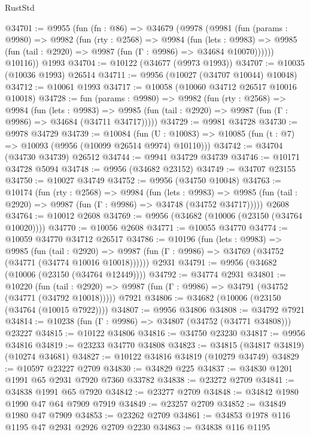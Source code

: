 \begin{lexlean}{RustStd}
\begin{coremodule}
@34701 := @9955
    (fun (fn : @86) =>
    @34679
      (@9978
        (@9981
          (fun (params : @9980) =>
          @9982
            (fun (rty : @2568) =>
            @9984
              (fun (lets : @9983) =>
              @9985 (fun (tail : @2920) => @9987 (fun (Γ : @9986) => @34684 @10070))))))
        @10116))
    @1993
@34704 := @10122 (@34677 (@9973 @1993))
@34707 := @10035 (@10036 @1993) @26514
@34711 := @9956 (@10027 (@34707 @10044) @10048)
@34712 := @10061 @1993
@34717 := @10058 (@10060 @34712 @26517 @10016 @10018)
@34728 := fun (params : @9980) =>
  @9982
    (fun (rty : @2568) =>
    @9984
      (fun (lets : @9983) =>
      @9985 (fun (tail : @2920) => @9987 (fun (Γ : @9986) => @34684 (@34711 @34717)))))
@34729 := @9981 @34728
@34730 := @9978 @34729
@34739 := @10084
    (fun (U : @10083) => @10085 (fun (t : @7) => @10093 (@9956 (@10099 @26514 @9974) @10110)))
@34742 := @34704 (@34730 @34739) @26512
@34744 := @9941 @34729 @34739
@34746 := @10171 @34728 @5094
@34748 := @9956 (@34682 @23152)
@34749 := @34707 @23155
@34750 := @10027 @34749
@34752 := @9956 (@34750 @10048)
@34763 := @10174
    (fun (rty : @2568) =>
    @9984
      (fun (lets : @9983) =>
      @9985 (fun (tail : @2920) => @9987 (fun (Γ : @9986) => @34748 (@34752 @34717)))))
    @2608
@34764 := @10012 @2608
@34769 := @9956 (@34682 (@10006 (@23150 (@34764 @10020))))
@34770 := @10056 @2608
@34771 := @10055 @34770
@34774 := @10059 @34770 @34712 @26517
@34786 := @10196
    (fun (lets : @9983) =>
    @9985
      (fun (tail : @2920) =>
      @9987 (fun (Γ : @9986) => @34769 (@34752 (@34771 (@34774 @10016 @10018))))))
    @2931
@34791 := @9956 (@34682 (@10006 (@23150 (@34764 @12449))))
@34792 := @34774 @2931
@34801 := @10220
    (fun (tail : @2920) => @9987 (fun (Γ : @9986) => @34791 (@34752 (@34771 (@34792 @10018)))))
    @7921
@34806 := @34682 (@10006 (@23150 (@34764 (@10015 @7922))))
@34807 := @9956 @34806
@34808 := @34792 @7921
@34814 := @10238 (fun (Γ : @9986) => @34807 (@34752 (@34771 @34808))) @23227
@34815 := @10122 @34806
@34816 := @34750 @23230
@34817 := @9956 @34816
@34819 := @23233 @34770 @34808
@34823 := @34815 (@34817 @34819) (@10274 @34681)
@34827 := @10122 @34816 @34819 (@10279 @34749)
@34829 := @10597 @23227 @2709
@34830 := @34829 @225
@34837 := @34830 @1201 @1991 @65 @2931 @7920 @7360 @33782
@34838 := @23272 @2709
@34841 := @34838 @1991 @65 @7920
@34842 := @23277 @2709
@34848 := @34842 @1980 @1990 @47 @64 @7909 @7919
@34849 := @23257 @2709
@34852 := @34849 @1980 @47 @7909
@34853 := @23262 @2709
@34861 := @34853 @1978 @116 @1195 @47 @2931 @2926 @2709 @2230
@34863 := @34838 @116 @1195

\end{coremodule}
\end{lexlean}
